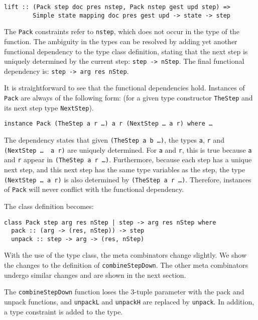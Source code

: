 \begin{small}
\begin{verbatim}
lift :: (Pack step doc pres nstep, Pack nstep gest upd step) =>
        Simple state mapping doc pres gest upd -> state -> step
\end{verbatim}
\end{small}

The \texttt{Pack} constraints refer to \texttt{nstep}, which does not occur in the type of the function. The ambiguity in the types can be resolved by adding yet another functional dependency to the type class definition, stating that the next step is uniquely determined by the current step: \texttt{step -> nStep}. The final functional dependency is: \texttt{step -> arg res nStep}. 

It is straightforward to see that the functional dependencies hold. Instances of \texttt{Pack} are always of the following form: (for a given type constructor \texttt{TheStep} and its next step type \texttt{NextStep}).

{\tt instance Pack (TheStep a r \dots) a r (NextStep \dots~a r) where \dots}

 The dependency states that given \texttt{(TheStep a b \dots)}, the types \texttt{a}, \texttt{r} and \texttt{(NextStep \dots~ a r)} are uniquely determined. For \texttt{a} and \texttt{r}, this is true because \texttt{a} and \texttt{r} appear in \texttt{(TheStep a r \dots)}. Furthermore, because each step has a unique next step, and this next step has the same type variables as the step, the type \texttt{(NextStep \dots~a r)} is also determined by \texttt{(TheStep a r \dots)}. Therefore, instances of \texttt{Pack} will never conflict with the functional dependency.

 The class definition becomes:

\begin{small}
\begin{verbatim}
class Pack step arg res nStep | step -> arg res nStep where
  pack :: (arg -> (res, nStep)) -> step
  unpack :: step -> arg -> (res, nStep)
\end{verbatim}
\end{small}

With the use of the type class, the meta combinators change slightly. We show the changes to the definition of \texttt{combineStepDown}. The other meta combinators undergo similar changes and are shown in the next section.

The \texttt{combineStepDown} function loses the 3-tuple parameter with the pack and unpack functions, and \texttt{unpackL} and \texttt{unpackH} are replaced by \texttt{unpack}. In addition, a type constraint is added to the type.

